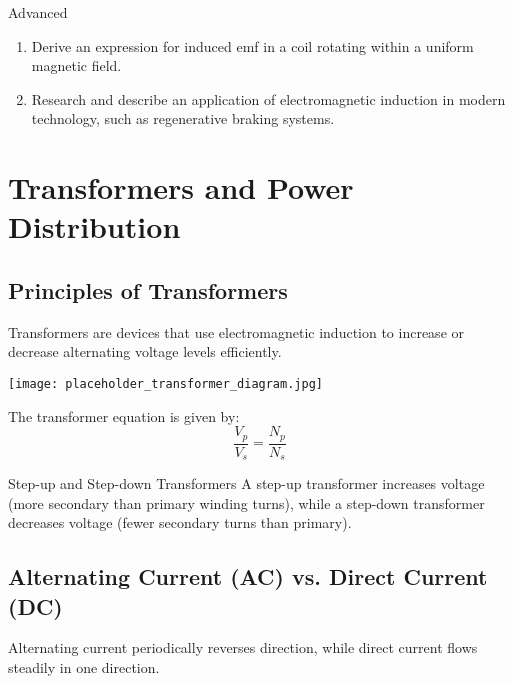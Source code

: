 \begin{tieredquestions}{Advanced}
\begin{enumerate}
    \item Derive an expression for induced emf in a coil rotating within a uniform magnetic field.
    \item Research and describe an application of electromagnetic induction in modern technology, such as regenerative braking systems.
\end{enumerate}
\end{tieredquestions}

\FloatBarrier

\section{Transformers and Power Distribution}
\FloatBarrier

\subsection{Principles of Transformers}
\FloatBarrier

Transformers are devices that use electromagnetic induction to increase or decrease alternating voltage levels efficiently.

\begin{marginfigure}[0pt]
\texttt{[image: placeholder\_transformer\_diagram.jpg]}
\caption{A basic transformer consists of primary and secondary coils wrapped around an iron core.}
\end{marginfigure}

The transformer equation is given by:
\[
\frac{V_p}{V_s} = \frac{N_p}{N_s}
\]


\begin{keyconcept}{Step-up and Step-down Transformers}
A step-up transformer increases voltage (more secondary than primary winding turns), while a step-down transformer decreases voltage (fewer secondary turns than primary).
\end{keyconcept}

\subsection{Alternating Current (AC) vs. Direct Current (DC)}
\FloatBarrier

Alternating current periodically reverses direction, while direct current flows steadily in one direction.

